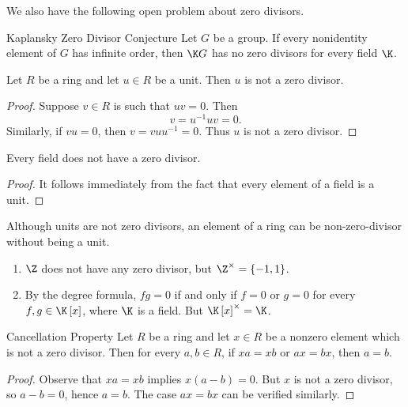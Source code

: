 \documentclass[pmath347]{subfiles}
\begin{document}
    We also have the following open problem about zero divisors.

    \clearpage
    \begin{statement}{Kaplansky Zero Divisor Conjecture}
        Let $G$ be a group. If every nonidentity element of $G$ has infinite order, then $\K G$ has no zero divisors for every field $\K$.
    \end{statement}

    \begin{prop}{}
        Let $R$ be a ring and let $u\in R$ be a unit. Then $u$ is not a zero divisor.
    \end{prop}

    \begin{proof}
        Suppose $v\in R$ is such that $uv=0$. Then
        \begin{equation*}
            v = u^{-1} u v =0.
        \end{equation*}
        Similarly, if $vu=0$, then $v=vuu^{-1} =0$. Thus $u$ is not a zero divisor.
    \end{proof}

    \begin{cor}{}
        Every field does not have a zero divisor.
    \end{cor}	

    \begin{proof}
        It follows immediately from the fact that every element of a field is a unit.
    \end{proof}

    \np Although units are not zero divisors, an element of a ring can be non-zero-divisor without being a unit.
    \begin{enumerate}
        \item $\Z$ does not have any zero divisor, but $\Z^{\times}=\left\lbrace -1,1 \right\rbrace$.
        \item By the degree formula, $fg = 0$ if and only if $f=0$ or $g=0$ for every $f,g\in\K\left[ x \right]$, where $\K$ is a field. But $\K\left[x\right]^\times =\K$.
    \end{enumerate}

    \begin{prop}{Cancellation Property}
        Let $R$ be a ring and let $x\in R$ be a nonzero element which is not a zero divisor. Then for every $a,b\in R$, if $xa=xb$ or $ax=bx$, then $a=b$.
    \end{prop}

    \begin{proof}
        Observe that $xa=xb$ implies $x\left( a-b \right) = 0$. But $x$ is not a zero divisor, so $a-b=0$, hence $a=b$. The case $ax=bx$ can be verified similarly.
    \end{proof}
\end{document}
